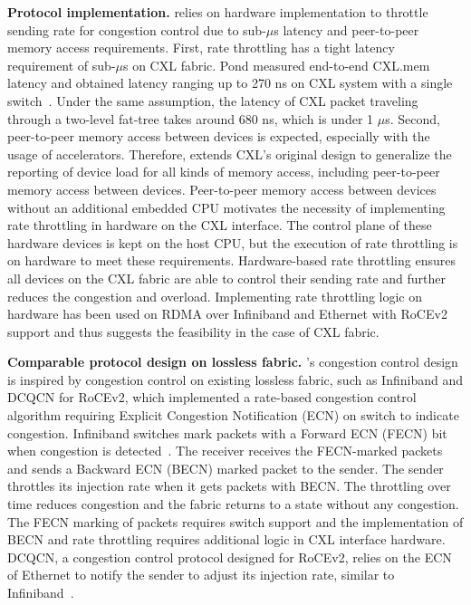 \noindent \textbf{Protocol implementation.}
\aurelia relies on hardware implementation to throttle sending rate for congestion control due to sub-$\mu$s latency and peer-to-peer memory access requirements.
%
First, rate throttling has a tight latency requirement of sub-$\mu$s on CXL fabric.
%
Pond measured end-to-end CXL.mem latency and obtained latency ranging up to 270 ns on CXL system with a single switch~\cite{cxl:hoti:2022, pond:asplos:2023}. 
%
Under the same assumption, the latency of CXL packet traveling through a two-level fat-tree takes around 680 ns, which is under 1 $\mu$s.
%
Second, peer-to-peer memory access between devices is expected, especially with the usage of accelerators. 
%
Therefore, \aurelia extends CXL's original design to generalize the reporting of device load for all kinds of memory access, including peer-to-peer memory access between devices.
%
Peer-to-peer memory access between devices without an additional embedded CPU motivates the necessity of implementing rate throttling in hardware on the CXL interface. 
%
The control plane of these hardware devices is kept on the host CPU, but the execution of rate throttling is on hardware to meet these requirements.  
%
Hardware-based rate throttling ensures all devices on the CXL fabric are able to control their sending rate and further reduces the congestion and overload.
%
Implementing rate throttling logic on hardware has been used on RDMA over Infiniband and Ethernet with RoCEv2 support and thus suggests the feasibility in the case of CXL fabric. 

\noindent \textbf{Comparable protocol design on lossless fabric.}
\aurelia's congestion control design is inspired by congestion control on existing lossless fabric, such as Infiniband and DCQCN for RoCEv2, which implemented a rate-based congestion control algorithm requiring Explicit Congestion Notification (ECN) on switch to indicate congestion.
%
Infiniband switches mark packets with a Forward ECN (FECN) bit when congestion is detected~\cite{infiniband-spec}. 
%
The receiver receives the FECN-marked packets and sends a Backward ECN (BECN) marked packet to the sender.
% 
The sender throttles its injection rate when it gets packets with BECN. The throttling over time reduces congestion and the fabric returns to a state without any congestion. 
%
The FECN marking of packets requires switch support and the implementation of BECN and rate throttling requires additional logic in CXL interface hardware.
%
DCQCN, a congestion control protocol designed for RoCEv2, relies on the ECN of Ethernet to notify the sender to adjust its injection rate, similar to Infiniband~\cite{dcqcn:sigcomm:2015}.
%

